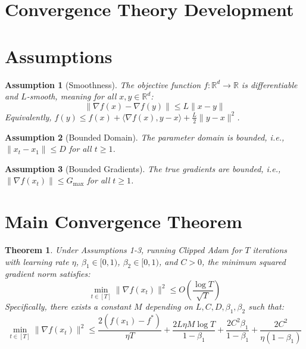 \documentclass{article}
\newtheorem{theorem}{Theorem}
\newtheorem{assumption}{Assumption}
\begin{document}
\section*{Convergence Theory Development}

\section*{Assumptions}
\begin{assumption}[Smoothness]
The objective function $f: \mathbb{R}^d \to \mathbb{R}$ is differentiable and $L$-smooth, meaning for all $x, y \in \mathbb{R}^d$:
$$
\|\nabla f(x) - \nabla f(y)\| \leq L \|x - y\|
$$
Equivalently, $f(y) \leq f(x) + \langle \nabla f(x), y - x \rangle + \frac{L}{2} \|y - x\|^2 $.
\end{assumption}

\begin{assumption}[Bounded Domain]
The parameter domain is bounded, i.e., $\|x_t - x_1\| \leq D$ for all $t \geq 1$.
\end{assumption}

\begin{assumption}[Bounded Gradients]
The true gradients are bounded, i.e., $\|\nabla f(x_t)\| \leq G_{\max}$ for all $t \geq 1$.
\end{assumption}

\section*{Main Convergence Theorem}
\begin{theorem}
Under Assumptions 1-3, running Clipped Adam for $T$ iterations with learning rate $\eta$, $\beta_1 \in [0, 1)$, $\beta_2 \in [0, 1)$, and $C > 0$, the minimum squared gradient norm satisfies:
$$
\min_{t \in [T]} \|\nabla f(x_t)\|^2 \leq O\left(\frac{\log T}{\sqrt{T}}\right)
$$
Specifically, there exists a constant $M$ depending on $L, C, D, \beta_1, \beta_2$ such that:
$$
\min_{t \in [T]} \|\nabla f(x_t)\|^2 \leq \frac{2(f(x_1) - f^*)}{\eta T} + \frac{2L\eta M \log T}{1-\beta_1} + \frac{2C^2 \beta_1}{1-\beta_1} + \frac{2C^2}{\eta(1-\beta_1)}
$$
\end{theorem}
\end{document}
